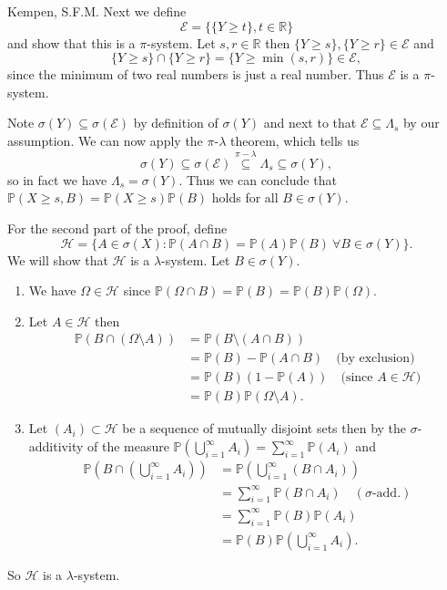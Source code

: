 \begin{solution}[5.3]{Kempen, S.F.M.}
    \noindent Next we define 
    $$ \mathcal{E} = \{ \{Y\geq t\},t\in \mathbb{R}\}$$
    and show that this is a $\pi$-system. Let $s,r\in \mathbb{R}$ then $\{Y\geq s\},\{Y\geq r\}\in \mathcal{E}$ and
    $$ \{Y\geq s\} \cap \{Y\geq r\} = \{Y\geq \min(s,r)\} \in \mathcal{E},$$
    since the minimum of two real numbers is just a real number. Thus $\mathcal{E}$ is a $\pi$-system.
    
    \noindent Note $\sigma(Y) \subseteq \sigma(\mathcal{E})$ by definition of $\sigma(Y)$ and next to that $\mathcal{E} \subseteq \Lambda_s$ by our assumption. We can now apply the $\pi$-$\lambda$ theorem, which tells us
    $$ \sigma(Y) \subseteq \sigma(\mathcal{E}) \stackrel{\pi-\lambda}{\subseteq} \Lambda_s \subseteq \sigma(Y), $$
    so in fact we have $\Lambda_s = \sigma(Y)$. Thus we can conclude that $\mathbb{P}(X\geq s, B) = \mathbb{P}(X\geq s)\mathbb{P}(B)$ holds for all $B\in \sigma(Y)$.
    
    \noindent For the second part of the proof, define
    $$ \mathcal{H} = \{A\in \sigma(X): \mathbb{P}(A\cap B) = \mathbb{P}(A)\mathbb{P}(B) \ \forall  B\in \sigma(Y) \}. $$
    We will show that $\mathcal{H}$ is a $\lambda$-system. Let $B\in \sigma(Y)$.
    \begin{enumerate}
        \item We have $\Omega \in \mathcal{H}$ since $\mathbb{P}(\Omega\cap B) = \mathbb{P}(B) = \mathbb{P}(B)\mathbb{P}(\Omega)$.
        \item Let $A \in \mathcal{H}$ then 
        \begin{align*}
            \mathbb{P}(B \cap (\Omega\setminus A) ) &= \mathbb{P}(B\setminus (A\cap B))\\
            &= \mathbb{P}(B) - \mathbb{P}(A\cap B) \quad \textrm{(by exclusion)}\\
            &= \mathbb{P}(B)(1-\mathbb{P}(A)) \quad \textrm{(since } A\in \mathcal{H})\\
            &= \mathbb{P}(B)\mathbb{P}(\Omega \setminus A).
        \end{align*}
        \item Let $(A_i) \subset \mathcal{H}$ be a sequence of mutually disjoint sets then by the $\sigma$-additivity of the measure $\mathbb{P}(\bigcup_{i=1}^\infty A_i) = \sum_{i=1}^\infty \mathbb{P}(A_i)$ and
        \begin{align*}
            \mathbb{P}(B\cap \left(\bigcup_{i=1}^\infty A_i\right)) &= \mathbb{P}(\bigcup_{i=1}^\infty (B \cap A_i))\\
            &= \sum_{i=1}^\infty \mathbb{P}(B\cap A_i) \quad (\sigma\textrm{-add.})\\
            &= \sum_{i=1}^\infty \mathbb{P}(B) \mathbb{P}(A_i)\\
            &= \mathbb{P}(B)\mathbb{P}(\bigcup_{i=1}^\infty A_i).
        \end{align*}
    \end{enumerate}
    So $\mathcal{H}$ is a $\lambda$-system.


\end{solution}
